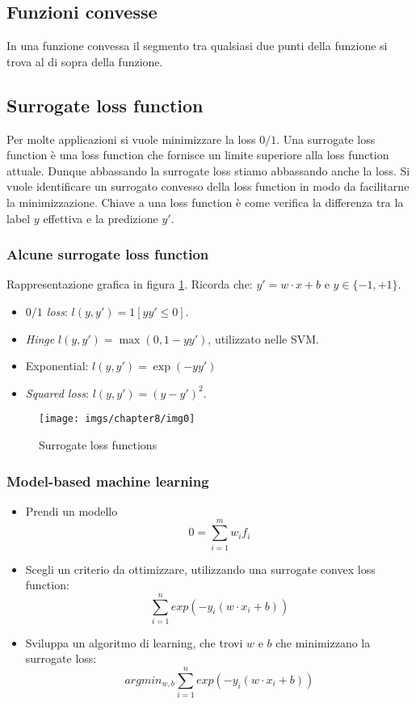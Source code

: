 	\subsection{Funzioni convesse}
	In una funzione convessa il segmento tra qualsiasi due punti della funzione si trova al di sopra della funzione.

	\subsection{Surrogate loss function}
	Per molte applicazioni si vuole minimizzare la loss $0/1$.
	Una surrogate loss function \`e una loss function che fornisce un limite superiore alla loss function attuale. 
	Dunque abbassando la surrogate loss stiamo abbassando anche la loss.
	Si vuole identificare un surrogato convesso della loss function in modo da facilitarne la minimizzazione.
	Chiave a una loss function \`e come verifica la differenza tra la label $y$ effettiva e la predizione $y'$.
	
		\subsubsection{Alcune surrogate loss function}
		
		Rappresentazione grafica in figura \ref{fig:chapter08-00}.
		Ricorda che: $y' = w \cdot x + b$ e $y \in \{-1,+1\}$.
		\begin{multicols}{2}
			\begin{itemize}
				\item \emph{$0/1$ loss}: $l(y, y')=1[yy'\le 0]$.
				\item \emph{Hinge} $l(y,y')=\max(0,1-yy')$, utilizzato nelle SVM.
				\item Exponential: $l(y,y')=\exp(-yy')$
				\item \emph{Squared loss}: $l(y,y')=(y-y')^2$.
			\end{itemize}
		\end{multicols}
		
		\begin{figure}
			\centering
			\texttt{[image: imgs/chapter8/img0]}
			\caption{Surrogate loss functions}
			\label{fig:chapter08-00}
		\end{figure}

		\subsubsection{Model-based machine learning}
		\begin{itemize}
			\item Prendi un modello 
			$$0=\sum\limits_{i=1}^m{w_i f_i}$$
			\item Scegli un criterio da ottimizzare, utilizzando una surrogate convex loss function:
			$$\sum\limits_{i=1}^n{exp(-y_i (w\cdot x_i+b))}$$
			\item Sviluppa un algoritmo di learning, che trovi $w$ e $b$ che minimizzano la surrogate loss: 
			$$argmin_{w,b}\sum\limits_{i=1}^n{exp(-y_i (w\cdot x_i+b))}$$
		\end{itemize}

